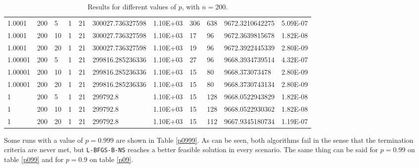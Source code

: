 \begin{table}
\begin{center}
\begin{tabular}{|l|l|l|l|l|l|l|l|l|l|l|}
      1.0001 & 200 & 5 &  1 & 21 & 300027.736327598 & 1.10E+03 & 306 & 638 & 9672.3210642275 & 5.09E-07\\
      1.0001 & 200 & 10 &  1 & 21 & 300027.736327598 & 1.10E+03 & 17 & 96 & 9672.3639815678 & 1.82E-08\\
      1.0001 & 200 & 20 &  1 & 21 & 300027.736327598 & 1.10E+03 & 19 & 96 & 9672.3922445339 & 2.80E-09\\
      1.00001 & 200 & 5 &  1 & 21 & 299816.285236336 & 1.10E+03 & 27 & 96 & 9668.3934739514 & 4.32E-07\\
      1.00001 & 200 & 10 &  1 & 21 & 299816.285236336 & 1.10E+03 & 15 & 80 & 9668.373073478 & 2.80E-09\\
      1.00001 & 200 & 20 &  1 & 21 & 299816.285236336 & 1.10E+03 & 15 & 80 & 9668.3730743134 & 2.80E-09\\
      1 & 200 & 5 & 1 &  21  & 299792.8 & 1.10E+03 & 15 & 128 & 9668.0522943829 & 1.82E-08\\
      1 & 200 & 10 & 1 &  21 & 299792.8 & 1.10E+03 & 15 & 128 & 9668.0522930362 & 1.82E-08\\
      1 & 200 & 20 & 1 &  21 & 299792.8 & 1.10E+03 & 15 & 112 & 9667.9345180734 & 1.19E-07\\
      \hline
    \end{tabular}
    \caption[Number of algorithm Iterations Changing $p$]{Results for different values of $p$, with $n = 200$.}
    \label{pmtable}
  \end{center}
\end{table}

Some runs with a value of $p = 0.999$ are shown in Table \ref{p0999}. As can be seen, both algorithms fail in the sense that the termination criteria are never met, but \texttt{L-BFGS-B-NS} reaches a better feasible solution in every scenario. The same thing can be said for $p = 0.99$ on table \ref{p099} and for $p = 0.9$ on table \ref{p09}.

